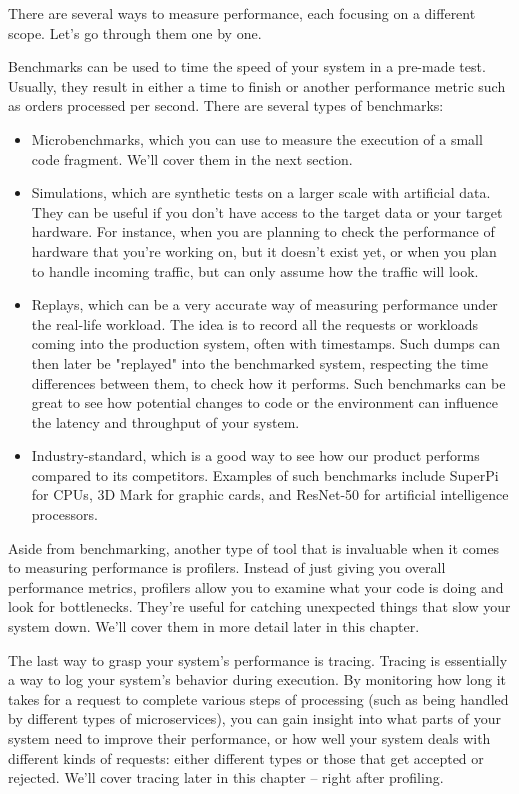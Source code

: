 There are several ways to measure performance, each focusing on a different scope. Let's go through them one by one.

Benchmarks can be used to time the speed of your system in a pre-made test. Usually, they result in either a time to finish or another performance metric such as orders processed per second. There are several types of benchmarks:

\begin{itemize}
\item 
Microbenchmarks, which you can use to measure the execution of a small code fragment. We'll cover them in the next section.

\item 
Simulations, which are synthetic tests on a larger scale with artificial data. They can be useful if you don't have access to the target data or your target hardware. For instance, when you are planning to check the performance of hardware that you're working on, but it doesn't exist yet, or when you plan to handle incoming traffic, but can only assume how the traffic will look.

\item 
Replays, which can be a very accurate way of measuring performance under the real-life workload. The idea is to record all the requests or workloads coming into the production system, often with timestamps. Such dumps can then later be "replayed" into the benchmarked system, respecting the time differences between them, to check how it performs. Such benchmarks can be great to see how potential changes to code or the environment can influence the latency and throughput of your system.

\item 
Industry-standard, which is a good way to see how our product performs compared to its competitors. Examples of such benchmarks include SuperPi for CPUs, 3D Mark for graphic cards, and ResNet-50 for artificial intelligence processors.
\end{itemize}

Aside from benchmarking, another type of tool that is invaluable when it comes to measuring performance is profilers. Instead of just giving you overall performance metrics, profilers allow you to examine what your code is doing and look for bottlenecks. They're useful for catching unexpected things that slow your system down. We'll cover them in more detail later in this chapter.

The last way to grasp your system's performance is tracing. Tracing is essentially a way to log your system's behavior during execution. By monitoring how long it takes for a request to complete various steps of processing (such as being handled by different types of microservices), you can gain insight into what parts of your system need to improve their performance, or how well your system deals with different kinds of requests: either different types or those that get accepted or rejected. We'll cover tracing later in this chapter – right after profiling.

